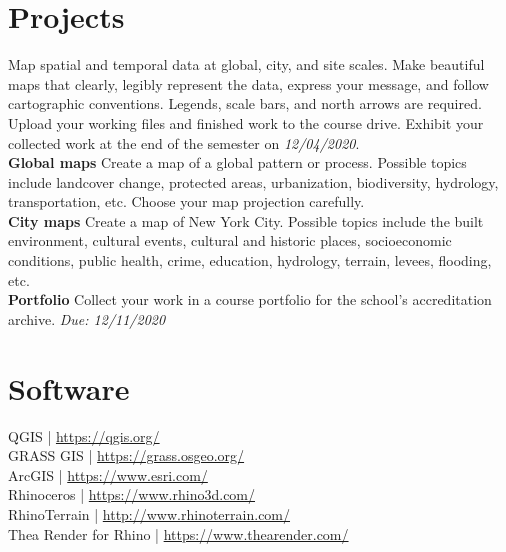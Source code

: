 \documentclass[11pt,article,oneside]{memoir}
\begin{document}

\section{Projects}
Map spatial and temporal data
at global, city, and site scales.
Make beautiful maps that 
clearly, legibly represent the data,
express your message, and
follow cartographic conventions.
Legends, scale bars, and north arrows are required.
Upload your working files and finished work to the course drive.
Exhibit your collected work at the end of the semester 
on \emph{12/04/2020}.\\

\noindent \textbf{Global maps}
Create a map of a global pattern or process. 
Possible topics include landcover change, protected areas,
urbanization, biodiversity, hydrology, transportation, etc.
Choose your map projection carefully.\\

\noindent \textbf{City maps}
Create a map of New York City. 
Possible topics include the built environment, 
cultural events, cultural and historic places, 
socioeconomic conditions, public health, crime, education, 
hydrology, terrain, levees, flooding, etc.\\



\noindent \textbf{Portfolio}
Collect your work in a course portfolio 
for the school's accreditation archive.
\emph{Due: 12/11/2020}\\

\clearpage

\section{Software}
\begin{multicols}{2}
\raggedright
QGIS | \url{https://qgis.org/}\\
GRASS GIS | \url{https://grass.osgeo.org/}\\
ArcGIS | \url{https://www.esri.com/}\\
Rhinoceros | \url{https://www.rhino3d.com/}\\
RhinoTerrain | \url{http://www.rhinoterrain.com/}\\
Thea Render for Rhino | \url{https://www.thearender.com/}\\
\end{multicols}
\end{document}

